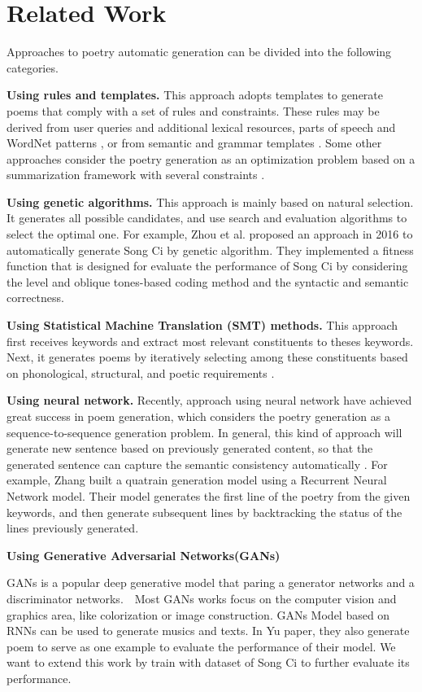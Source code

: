 \section{Related Work}   
Approaches to poetry automatic generation can be divided into the following categories.

\textbf{Using rules and templates.}
%
This approach adopts templates to generate poems that comply with a set of rules and constraints.
%
These rules may be derived from user queries and additional lexical resources\cite{wu2009new,tosa2008hitch},  parts of speech and WordNet patterns \cite{netzer2009gaiku},  or from semantic and grammar templates \cite{oliveira2012poetryme}.
% 
Some other approaches consider the poetry generation as an optimization problem based on a summarization framework with several constraints \cite{yan2013poet}.

\textbf {Using genetic algorithms.} This approach is mainly based on natural selection. It generates all possible candidates, and use search and evaluation algorithms to select the optimal one\cite{manurung2004evolutionary,manurung2012using}.
%
For example, Zhou et al.\cite{zhou2010genetic} proposed an approach in 2016 to automatically generate Song Ci by genetic algorithm.
%
They implemented a fitness function that is designed for evaluate the performance of Song Ci by considering the level and oblique tones-based coding method and the syntactic and semantic correctness.


\textbf{Using Statistical Machine Translation (SMT) methods.} 
 This approach first receives keywords and extract most relevant constituents to theses keywords.  Next, it generates poems by iteratively selecting among these constituents based on phonological, structural, and poetic requirements \cite{jiang2008generating}.  

\textbf{Using neural network.}  Recently, approach using neural network have achieved great success in poem generation, which considers the poetry generation as a sequence-to-sequence generation problem.
% 
In general, this kind of approach will generate new sentence based on previously generated content, so that the generated sentence can capture the semantic consistency automatically \cite{wang2016chinese,bahdanau2014neural}.
%
For example, Zhang \etal built a quatrain generation model using a Recurrent Neural Network model.  Their model generates the first line of the poetry from the given keywords, and then generate subsequent lines by backtracking the status of the lines previously generated.
% 

\textbf{Using Generative Adversarial Networks(GANs) } 

GANs is a popular deep generative model that paring a generator networks and a discriminator networks\cite{goodfellow2014gan}.　Most GANs works focus on the computer vision and graphics area, like colorization or image construction. GANs Model based on RNNs can be used to generate musics\cite{mogren2016crnngan} and texts\cite{yu2016seqgan}. In Yu \etal paper, they also generate poem to serve as one example to evaluate the performance of their model. We want to extend this work by train with dataset of Song Ci to further evaluate its performance.